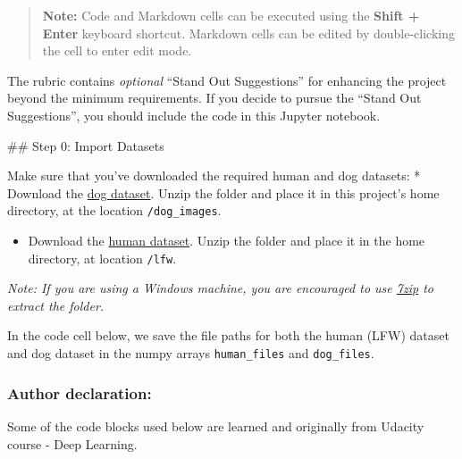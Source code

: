 \documentclass[11pt]{article}
\providecommand{\tightlist}{%
      \setlength{\itemsep}{0pt}\setlength{\parskip}{0pt}}
\begin{document}
\begin{quote}
\textbf{Note:} Code and Markdown cells can be executed using the
\textbf{Shift + Enter} keyboard shortcut. Markdown cells can be edited
by double-clicking the cell to enter edit mode.
\end{quote}

The rubric contains \emph{optional} ``Stand Out Suggestions'' for
enhancing the project beyond the minimum requirements. If you decide to
pursue the ``Stand Out Suggestions'', you should include the code in
this Jupyter notebook.

 \#\# Step 0: Import Datasets

Make sure that you've downloaded the required human and dog datasets: *
Download the
\href{https://s3-us-west-1.amazonaws.com/udacity-aind/dog-project/dogImages.zip}{dog
dataset}. Unzip the folder and place it in this project's home
directory, at the location \texttt{/dog\_images}.

\begin{itemize}
\tightlist
\item
  Download the
  \href{https://s3-us-west-1.amazonaws.com/udacity-aind/dog-project/lfw.zip}{human
  dataset}. Unzip the folder and place it in the home directory, at
  location \texttt{/lfw}.
\end{itemize}

\emph{Note: If you are using a Windows machine, you are encouraged to
use \href{http://www.7-zip.org/}{7zip} to extract the folder.}

In the code cell below, we save the file paths for both the human (LFW)
dataset and dog dataset in the numpy arrays \texttt{human\_files} and
\texttt{dog\_files}.

    \hypertarget{author-declaration}{%
\subsubsection{Author declaration:}\label{author-declaration}}

Some of the code blocks used below are learned and originally from
Udacity course - Deep Learning.
\end{document}
